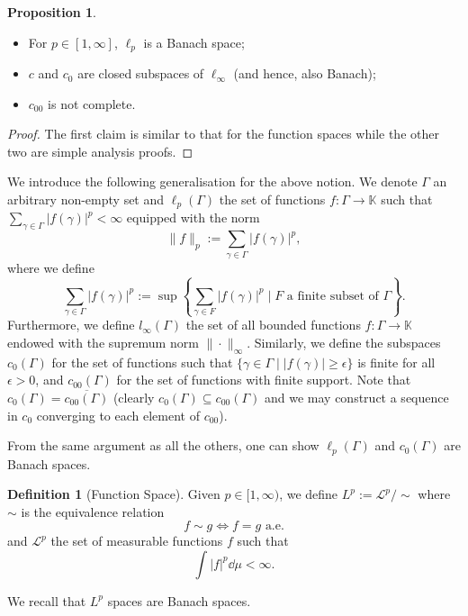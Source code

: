 \documentclass[
]{article}
\theoremstyle{definition}
\theoremstyle{definition}
\newtheorem{definition}{Definition}[section]
\newtheorem{proposition}{Proposition}[section]
\begin{document}
\begin{proposition}~
  \begin{itemize}
    \item For \(p \in [1, \infty]\), \(\ell_p\) is a Banach space;
    \item \(c\) and \(c_0\) are closed subspaces of \(\ell_\infty\) (and hence, 
      also Banach);
    \item \(c_{00}\) is not complete.
  \end{itemize}
\end{proposition}
\begin{proof}
  The first claim is similar to that for the function spaces while the other 
  two are simple analysis proofs.
\end{proof}

We introduce the following generalisation for the above notion. We denote 
\(\Gamma\) an arbitrary non-empty set and \(\ell_p(\Gamma)\) the set of functions 
\(f : \Gamma \to \mathbb{K}\) such that \(\sum_{\gamma \in \Gamma} 
|f(\gamma)|^p < \infty\) equipped with the norm 
\[\|f\|_p := \sum_{\gamma \in \Gamma} |f(\gamma)|^p,\]
where we define 
\[\sum_{\gamma \in \Gamma} |f(\gamma)|^p := \sup \left\{\sum_{\gamma \in F} 
  |f(\gamma)|^p \mid F \text{ a finite subset of } \Gamma\right\}.\]
Furthermore, we define \(l_\infty(\Gamma)\) the set of all bounded functions 
\(f : \Gamma \to \mathbb{K}\) endowed with the supremum norm \(\|\cdot\|_\infty\). 
Similarly, we define the subspaces \(c_{0}(\Gamma)\) for the set of functions 
such that \(\{\gamma \in \Gamma \mid |f(\gamma)| \ge \epsilon\}\) is finite for 
all \(\epsilon > 0\), and \(c_{00}(\Gamma)\) for the set of functions with finite 
support. Note that \(c_0(\Gamma) = \overline{c_{00}(\Gamma)}\) (clearly 
\(c_0(\Gamma) \subseteq c_{00}(\Gamma)\) and we may construct a sequence in 
\(c_0\) converging to each element of \(c_{00}\)).
 
From the same argument as all the others, one can show \(\ell_p(\Gamma)\) and 
\(c_{0}(\Gamma)\) are Banach spaces.

\begin{definition}[Function Space]
  Given \(p \in [1, \infty)\), we define \(L^p := \mathcal{L}^p / \sim\) where 
  \(\sim\) is the equivalence relation
  \[f \sim g \iff f = g \text{ a.e.}\]
  and \(\mathcal{L}^p\) the set of measurable functions \(f\) such that 
  \[\int |f|^p \dd \mu < \infty.\]
\end{definition}

We recall that \(L^p\) spaces are Banach spaces.
\end{document}
